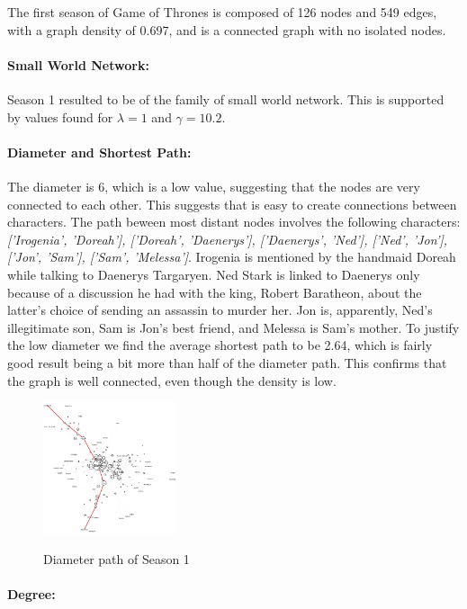 \documentclass[10pt,twocolumn,letterpaper]{article}
\begin{document}
The first season of Game of Thrones is composed of 126 nodes and 549 edges, with a graph density of 0.697, and is a connected graph with no isolated nodes.

\paragraph{Small World Network:} Season 1 resulted to be of the family of small world network. This is supported by values found for $\lambda=1$ and $\gamma=10.2$.

\paragraph{Diameter and Shortest Path:}

The diameter is 6, which is a low value, suggesting that the nodes are very connected to each other. This suggests that is easy to create connections between characters. The path beween most distant nodes involves the following characters: \textit{['Irogenia', 'Doreah'], ['Doreah', 'Daenerys'], ['Daenerys', 'Ned'], ['Ned', 'Jon'], ['Jon', 'Sam'], ['Sam', 'Melessa']}. Irogenia is mentioned by the handmaid Doreah while talking to Daenerys Targaryen. Ned Stark is linked to Daenerys only because of a discussion he had with the king, Robert Baratheon, about the latter's choice of sending an assassin to murder her. Jon is, apparently, Ned's illegitimate son, Sam is Jon's best friend, and Melessa is Sam's mother.
To justify the low diameter we find the average shortest path to be 2.64, which is fairly good result being a bit more than half of the diameter path. This confirms that the graph is well connected, even though the density is low.

\begin{figure}[!h]
    \includegraphics[width=0.35\textwidth]{img/s1/diameter_path.jpg} \\
    \caption{\small{Diameter path of Season 1}}
\end{figure}

\paragraph{Degree:}
\end{document}
